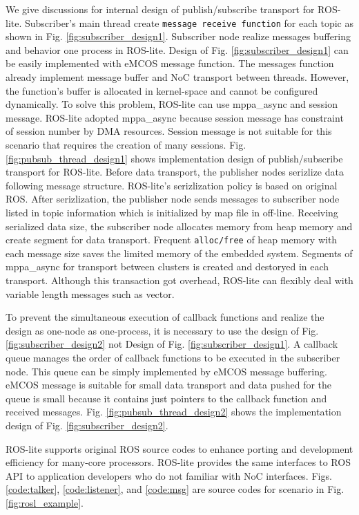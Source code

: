 We give discussions for internal design of publish/subscribe transport for ROS-lite.
Subscriber's main thread create \texttt{message receive function} for each topic as shown in Fig. \ref{fig:subscriber_design1}.
Subscriber node realize messages buffering and behavior one process in ROS-lite.
Design of Fig. \ref{fig:subscriber_design1} can be easily implemented with eMCOS message function.
The messages function already implement message buffer and NoC transport between threads.
However, the function's buffer is allocated in kernel-space and cannot be configured dynamically.
To solve this problem, ROS-lite can use mppa\_async and session message.
ROS-lite adopted mppa\_async because session message has constraint of session number by DMA resources.
Session message is not suitable for this scenario that requires the creation of many sessions.
Fig. \ref{fig:pubsub_thread_design1} shows implementation design of publish/subscribe transport for ROS-lite.
Before data transport, the publisher nodes serizlize data following message structure.
ROS-lite's serizlization policy is based on original ROS.
After serizlization, the publisher node sends messages to subscriber node listed in topic information which is initialized by map file in off-line.
Receiving serialized data size, the subscriber node allocates memory from heap memory and create segment for data transport.
Frequent \texttt{alloc/free} of heap memory with each message size saves the limited memory of the embedded system.
Segments of mppa\_async for transport between clusters is created and destoryed in each transport.
Although this transaction got overhead, ROS-lite can flexibly deal with variable length messages such as vector.

To prevent the simultaneous execution of callback functions and realize the design as one-node as one-process, it is necessary to use the design of Fig. \ref{fig:subscriber_design2} not Design of Fig. \ref{fig:subscriber_design1}.
A callback queue manages the order of callback functions to be executed in the subscriber node.
This queue can be simply implemented by eMCOS message buffering.
eMCOS message is suitable for small data transport and data pushed for the queue is small because it contains just pointers to the callback function and received messages.
Fig. \ref{fig:pubsub_thread_design2} shows the implementation design of Fig. \ref{fig:subscriber_design2}.

ROS-lite supports original ROS source codes to enhance porting and development efficiency for many-core processors.
ROS-lite provides the same interfaces to ROS API to application developers who do not familiar with NoC interfaces.
Figs. \ref{code:talker}, \ref{code:listener}, and \ref{code:msg} are source codes for scenario in Fig. \ref{fig:rosl_example}.

